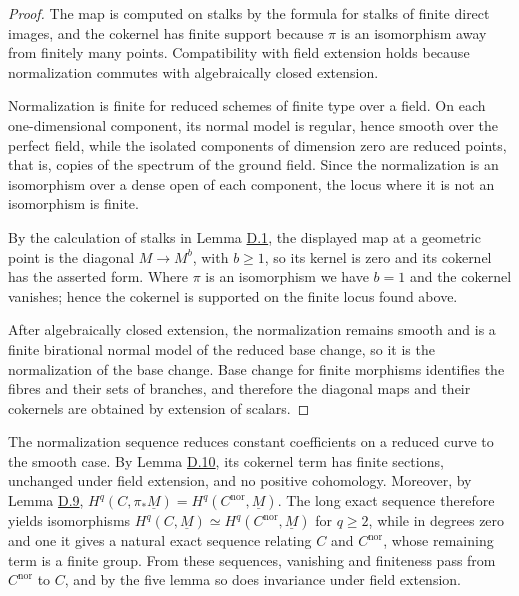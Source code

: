 \documentclass[11pt]{article}
\begin{document}
\begin{proof}[{Proof}]\label{bp208}%
The map is computed on stalks by the formula for stalks of finite direct images, and the cokernel has finite support because \(\pi\) is an isomorphism away from finitely many points. Compatibility with field extension holds because normalization commutes with algebraically closed extension.

Normalization is finite for reduced schemes of finite type over a field.  On each one-dimensional component, its normal model is regular, hence smooth over the perfect field, while the isolated components of dimension zero are reduced points, that is, copies of the spectrum of the ground field.  Since the normalization is an isomorphism over a dense open of each component, the locus where it is not an isomorphism is finite.

By the calculation of stalks in Lemma \hyperref[bp174]{D.1}, the displayed map at a geometric point is the diagonal \(M\to M^b\), with \(b\geq1\), so its kernel is zero and its cokernel has the asserted form.  Where \(\pi\) is an isomorphism we have \(b=1\) and the cokernel vanishes; hence the cokernel is supported on the finite locus found above.

After algebraically closed extension, the normalization remains smooth and is a finite birational normal model of the reduced base change, so it is the normalization of the base change.  Base change for finite morphisms identifies the fibres and their sets of branches, and therefore the diagonal maps and their cokernels are obtained by extension of scalars.
\end{proof}

\label{bp209}%
The normalization sequence reduces constant coefficients on a reduced curve to the smooth case. By Lemma \hyperref[bp204]{D.10}, its cokernel term has finite sections, unchanged under field extension, and no positive cohomology. Moreover, by Lemma \hyperref[bp201]{D.9}, \(H^q(C,\pi_*\underline M)=H^q(C^{\mathrm{nor}},\underline M)\). The long exact sequence therefore yields isomorphisms \(H^q(C,\underline M)\simeq H^q(C^{\mathrm{nor}},\underline M)\) for \(q\geq2\), while in degrees zero and one it gives a natural exact sequence relating \(C\) and \(C^{\mathrm{nor}}\), whose remaining term is a finite group. From these sequences, vanishing and finiteness pass from \(C^{\mathrm{nor}}\) to \(C\), and by the five lemma so does invariance under field extension.
\end{document}
